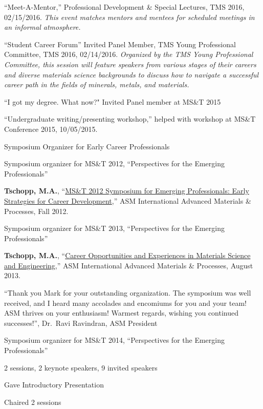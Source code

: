 \begin{itemize}
\item ``Meet-A-Mentor,'' Professional Development \& Special Lectures, TMS 2016, 02/15/2016. \textit{This event matches mentors and mentees for scheduled meetings in an informal atmosphere.}
\item ``Student Career Forum'' Invited Panel Member, TMS Young Professional Committee, TMS 2016, 02/14/2016.  \textit{Organized by the TMS Young Professional Committee, this session will feature speakers from various stages of their careers and diverse materials science backgrounds to discuss how to navigate a successful career path in the fields of minerals, metals, and materials.}
\item “I got my degree. What now?" Invited Panel member at MS\&T 2015
\item ``Undergraduate writing/presenting workshop,'' helped with workshop at MS\&T Conference 2015, 10/05/2015.
\item Symposium Organizer for Early Career Professionals
\begin{list2}
\item	Symposium organizer for MS\&T 2012, ``Perspectives for the Emerging Professionals''
\begin{list2}
\item
\textbf{Tschopp, M.A.}, ``\href{http://amp.digitaledition.asminternational.org/i/80917/60}{MS\&T 2012 Symposium for Emerging Professionals: Early Strategies for Career Development},'' ASM International Advanced Materials \& Processes, Fall 2012.
\end{list2}

\item	Symposium organizer for MS\&T 2013, ``Perspectives for the Emerging Professionals''
\begin{list2}
\item
\textbf{Tschopp, M.A.}, ``\href{http://amp.digitaledition.asminternational.org/i/147077/59}{Career Opportunities and Experiences in Materials Science and Engineering},'' ASM International Advanced Materials \& Processes, August 2013.
\item ``Thank you Mark for your outstanding organization. The symposium was well received, and I heard many accolades and encomiums for you and your team! ASM thrives on your enthusiasm! Warmest regards, wishing you continued successes!'', Dr.~Ravi Ravindran, ASM President
\end{list2}
\item	Symposium organizer for MS\&T 2014, ``Perspectives for the Emerging Professionals''
\begin{list2}
\item  2 sessions, 2 keynote speakers, 9 invited speakers
\item  Gave Introductory Presentation
\item  Chaired 2 sessions
\end{list2}
\end{list2}


\end{itemize}
